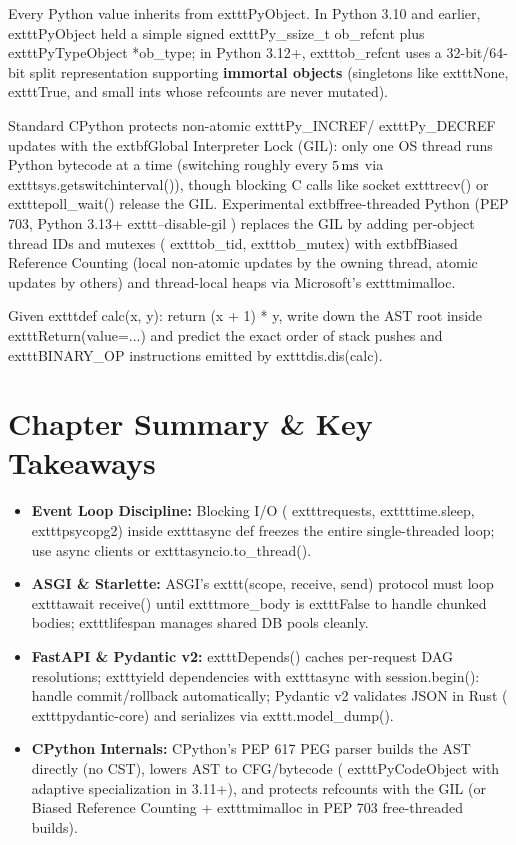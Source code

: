 Every Python value inherits from 	exttt{PyObject}. In Python 3.10 and earlier, 	exttt{PyObject} held a simple signed 	exttt{Py\_ssize\_t ob\_refcnt} plus 	exttt{PyTypeObject *ob\_type}; in Python 3.12+, 	exttt{ob\_refcnt} uses a 32-bit/64-bit split representation supporting \textbf{immortal objects} (singletons like 	exttt{None}, 	exttt{True}, and small ints whose refcounts are never mutated).

Standard CPython protects non-atomic 	exttt{Py\_INCREF}/	exttt{Py\_DECREF} updates with the 	extbf{Global Interpreter Lock (GIL)}: only one OS thread runs Python bytecode at a time (switching roughly every $5\text{\,ms}$ via 	exttt{sys.getswitchinterval()}), though blocking C calls like socket 	exttt{recv()} or 	exttt{epoll\_wait()} release the GIL. Experimental 	extbf{free-threaded Python} (PEP 703, Python 3.13+ 	exttt{--disable-gil} \cite{pep703}) replaces the GIL by adding per-object thread IDs and mutexes (	exttt{ob\_tid}, 	exttt{ob\_mutex}) with 	extbf{Biased Reference Counting} (local non-atomic updates by the owning thread, atomic updates by others) and thread-local heaps via Microsoft's 	exttt{mimalloc}.

\begin{tryityourselfbox}
Given 	exttt{def calc(x, y): return (x + 1) * y}, write down the AST root inside 	exttt{Return(value=...)} and predict the exact order of stack pushes and 	exttt{BINARY\_OP} instructions emitted by 	exttt{dis.dis(calc)}.
\end{tryityourselfbox}

\section{Chapter Summary \protect\& Key Takeaways}

\begin{itemize}[leftmargin=15pt]
  \item \textbf{Event Loop Discipline:} Blocking I/O (	exttt{requests}, 	exttt{time.sleep}, 	exttt{psycopg2}) inside 	exttt{async def} freezes the entire single-threaded loop; use async clients or 	exttt{asyncio.to\_thread()}.
  \item \textbf{ASGI \& Starlette:} ASGI's 	exttt{(scope, receive, send)} protocol must loop 	exttt{await receive()} until 	exttt{more\_body} is 	exttt{False} to handle chunked bodies; 	exttt{lifespan} manages shared DB pools cleanly.
  \item \textbf{FastAPI \& Pydantic v2:} 	exttt{Depends()} caches per-request DAG resolutions; 	exttt{yield} dependencies with 	exttt{async with session.begin():} handle commit/rollback automatically; Pydantic v2 validates JSON in Rust (	exttt{pydantic-core}) and serializes via 	exttt{.model\_dump()}.
  \item \textbf{CPython Internals:} CPython's PEP 617 PEG parser builds the AST directly (no CST), lowers AST to CFG/bytecode (	exttt{PyCodeObject} with adaptive specialization in 3.11+), and protects refcounts with the GIL (or Biased Reference Counting + 	exttt{mimalloc} in PEP 703 free-threaded builds).
\end{itemize}

